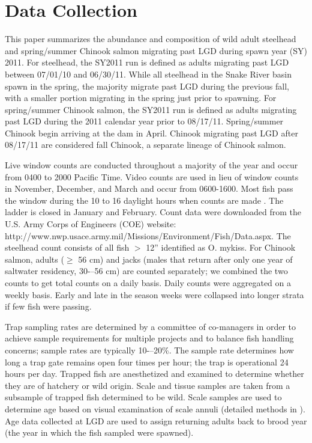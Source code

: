 \documentclass[12pt]{article}
\begin{document}
\section{Data Collection}
This paper summarizes the abundance and composition of wild adult steelhead and spring/summer Chinook salmon migrating past LGD during spawn year (SY) 2011. For steelhead, the SY2011 run is defined as adults migrating past LGD between 07/01/10 and 06/30/11. While all steelhead in the Snake River basin spawn in the spring, the majority migrate past LGD during the previous fall, with a smaller portion migrating in the spring just prior to spawning. For spring/summer Chinook salmon, the SY2011 run is defined as adults migrating past LGD during the 2011 calendar year prior to 08/17/11. Spring/summer Chinook begin arriving at the dam in April. Chinook migrating past LGD after 08/17/11 are considered fall Chinook, a separate lineage of Chinook salmon.

Live window counts are conducted throughout a majority of the year and occur from 0400 to 2000 Pacific Time. Video counts are used in lieu of window counts in November, December, and March and occur from 0600-1600. Most fish pass the window during the 10 to 16 daylight hours when counts are made \cite{Cassinelli2012}. The ladder is closed in January and February. Count data were downloaded from the U.S. Army Corps of Engineers (COE) website: http://www.nwp.usace.army.mil/Missions/Environment/Fish/Data.aspx. The steelhead count consists of all fish $>$ 12'' identified as O. mykiss. For Chinook salmon, adults ($\geq$ 56 cm) and jacks (males that return after only one year of saltwater residency, 30-–56 cm) are counted separately; we combined the two counts to get total counts on a daily basis. Daily counts were aggregated on a weekly basis. Early and late in the season weeks were collapsed into longer strata if few fish were passing.

Trap sampling rates are determined by a committee of co-managers in order to achieve sample requirements for multiple projects and to balance fish handling concerns; sample rates are typically 10-–20\%. The sample rate determines how long a trap gate remains open four times per hour; the trap is operational 24 hours per day. Trapped fish are anesthetized and examined to determine whether they are of hatchery or wild origin. Scale and tissue samples are taken from a subsample of trapped fish determined to be wild. Scale samples are used to determine age based on visual examination of scale annuli (detailed methods in ). Age data collected at LGD are used to assign returning adults back to brood year (the year in which the fish sampled were spawned).
\end{document}
